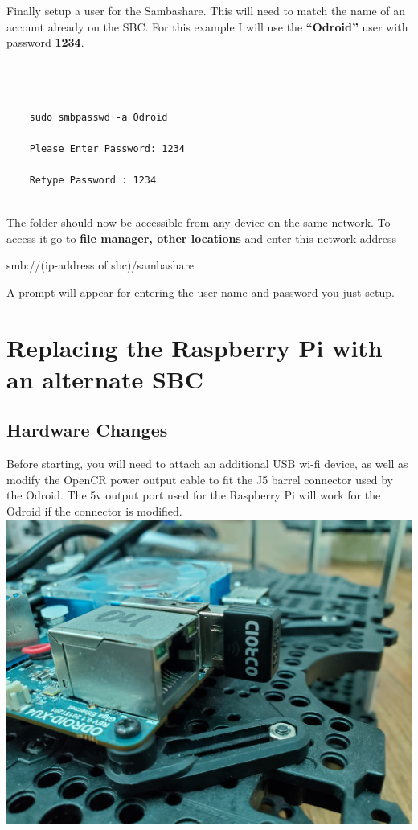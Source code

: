 \documentclass[12]{article}
\begin{document}
Finally setup a user for the Sambashare. This will need to match the name of an account already on the SBC. For this example I will use the \textbf{“Odroid”} user with password \textbf{1234}.


\begin{lstlisting}

	

    sudo smbpasswd -a Odroid

    Please Enter Password: 1234

    Retype Password : 1234


\end{lstlisting}


The folder should now be accessible from any device on the same network. To access it go to \textbf{file manager, other locations} and enter this network address

smb://(ip-address of sbc)/sambashare

A prompt will appear for entering the user name and password you just setup.



\newpage

\section{Replacing the Raspberry Pi with an alternate SBC}


\subsection{Hardware Changes}


Before starting, you will need to attach an additional USB wi-fi device, as well as modify the OpenCR power output cable to fit the J5 barrel connector used by the Odroid. The 5v output port used for the Raspberry Pi will work for the Odroid if the connector is modified.\\






\includegraphics[width=0.7\linewidth]{images/WIFI_chip.jpg}\\
\end{document}
